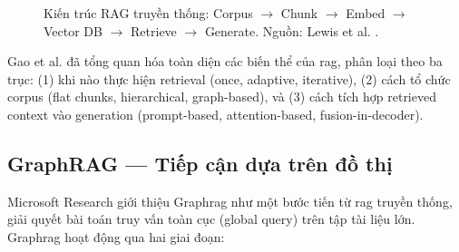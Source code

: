\begin{figure}[H]
    \centering
    \caption{Kiến trúc RAG truyền thống: Corpus $\rightarrow$ Chunk $\rightarrow$ Embed $\rightarrow$ Vector DB $\rightarrow$ Retrieve $\rightarrow$ Generate. Nguồn: Lewis et al. \cite{lewis2020rag}.}
    \label{fig:rag_traditional}
\end{figure}

Gao et al. \cite{gao2024retrieval} đã tổng quan hóa toàn diện các biến thể của \gls{rag}, phân loại theo ba trục: (1) khi nào thực hiện retrieval (once, adaptive, iterative), (2) cách tổ chức corpus (flat chunks, hierarchical, graph-based), và (3) cách tích hợp retrieved context vào generation (prompt-based, attention-based, fusion-in-decoder).

\subsection{GraphRAG — Tiếp cận dựa trên đồ thị}

Microsoft Research giới thiệu Graph\gls{rag} \cite{edge2024graphrag} như một bước tiến từ \gls{rag} truyền thống, giải quyết bài toán truy vấn toàn cục (global query) trên tập tài liệu lớn. Graph\gls{rag} hoạt động qua hai giai đoạn:

